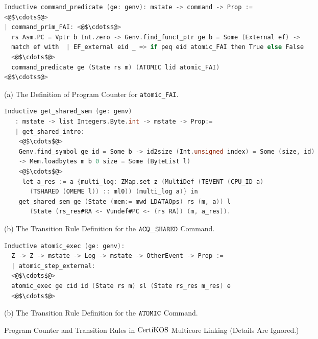 \begin{figure}
\begin{lstlisting}[language=C]
Inductive command_predicate (ge: genv): mstate -> command -> Prop :=
<@$\cdots$@>
| command_prim_FAI: <@$\cdots$@>
  rs Asm.PC = Vptr b Int.zero -> Genv.find_funct_ptr ge b = Some (External ef) ->
  match ef with  | EF_external eid _ => if peq eid atomic_FAI then True else False
  <@$\cdots$@>
  command_predicate ge (State rs m) (ATOMIC lid atomic_FAI) 
<@$\cdots$@>
\end{lstlisting}
\begin{center}
(a) The Definition of Program Counter for \lstinline$atomic_FAI$.
\end{center}
\begin{lstlisting}[language=C, deletekeywords={int, unsigned}]
 Inductive get_shared_sem (ge: genv) 
   : mstate -> list Integers.Byte.int -> mstate -> Prop:=
   | get_shared_intro: 
    <@$\cdots$@>
    Genv.find_symbol ge id = Some b -> id2size (Int.unsigned index) = Some (size, id)
    -> Mem.loadbytes m b 0 size = Some (ByteList l)
    <@$\cdots$@>
     let a_res := a {multi_log: ZMap.set z (MultiDef (TEVENT (CPU_ID a)
       (TSHARED (OMEME l)) :: ml0)) (multi_log a)} in
    get_shared_sem ge (State (mem:= mwd LDATAOps) rs (m, a)) l 
       (State (rs_res#RA <- Vundef#PC <- (rs RA)) (m, a_res)).
\end{lstlisting}
\begin{center}
(b) The Transition Rule Definition for the ${{\mathrm{\texttt{ACQ}}}\_{\mathrm{\texttt{SHARED}}}}$ Command.
\end{center}
\begin{lstlisting}[language=C]
Inductive atomic_exec (ge: genv):
  Z -> Z -> mstate -> Log -> mstate -> OtherEvent -> Prop :=
  | atomic_step_external:
  <@$\cdots$@>
  atomic_exec ge cid id (State rs m) sl (State rs_res m_res) e
  <@$\cdots$@>
\end{lstlisting}
\begin{center}
(b) The  Transition Rule Definition for the ${{\mathrm{\texttt{ATOMIC}}}}$ Command.
\end{center}
\caption{Program Counter and Transition Rules in $\mathrm{CertiKOS}$ Multicore Linking (Details Are Ignored.)}
\label{fig:chapter:certikos:definitions-for-hw-abstract-semantics}
\end{figure}

